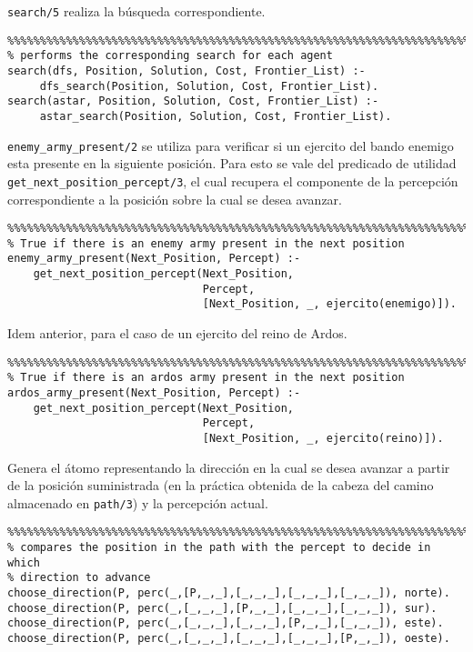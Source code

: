 \documentclass[a4paper,12pt]{report}
\begin{document}
\texttt{search/5} realiza la b\'{u}squeda correspondiente.

\begin{verbatim}
%%%%%%%%%%%%%%%%%%%%%%%%%%%%%%%%%%%%%%%%%%%%%%%%%%%%%%%%%%%%%%%%%%%%%%%%%%%%%%%
% performs the corresponding search for each agent
search(dfs, Position, Solution, Cost, Frontier_List) :-
     dfs_search(Position, Solution, Cost, Frontier_List).
search(astar, Position, Solution, Cost, Frontier_List) :-
     astar_search(Position, Solution, Cost, Frontier_List).

\end{verbatim}

\texttt{enemy\_army\_present/2} se utiliza para verificar si un ejercito del bando enemigo esta presente en la
siguiente posici\'{o}n. Para esto se vale del predicado de utilidad \texttt{get\_next\_position\_percept/3}, el cual
recupera el componente de la percepci\'{o}n correspondiente a la posici\'{o}n sobre la cual se desea avanzar.

\begin{verbatim}
%%%%%%%%%%%%%%%%%%%%%%%%%%%%%%%%%%%%%%%%%%%%%%%%%%%%%%%%%%%%%%%%%%%%%%%%%%%%%%%
% True if there is an enemy army present in the next position
enemy_army_present(Next_Position, Percept) :-
    get_next_position_percept(Next_Position,
                              Percept,
                              [Next_Position, _, ejercito(enemigo)]).

\end{verbatim}

Idem anterior, para el caso de un ejercito del reino de Ardos.

\begin{verbatim}
%%%%%%%%%%%%%%%%%%%%%%%%%%%%%%%%%%%%%%%%%%%%%%%%%%%%%%%%%%%%%%%%%%%%%%%%%%%%%%%
% True if there is an ardos army present in the next position
ardos_army_present(Next_Position, Percept) :-
    get_next_position_percept(Next_Position,
                              Percept,
                              [Next_Position, _, ejercito(reino)]).

\end{verbatim}

Genera el \'{a}tomo representando la direcci\'{o}n en la cual se desea avanzar a partir de la posici\'{o}n suministrada
(en la pr\'{a}ctica obtenida de la cabeza del camino almacenado en \texttt{path/3}) y la percepci\'{o}n actual.

\begin{verbatim}
%%%%%%%%%%%%%%%%%%%%%%%%%%%%%%%%%%%%%%%%%%%%%%%%%%%%%%%%%%%%%%%%%%%%%%%%%%%%%%%
% compares the position in the path with the percept to decide in which
% direction to advance
choose_direction(P, perc(_,[P,_,_],[_,_,_],[_,_,_],[_,_,_]), norte).
choose_direction(P, perc(_,[_,_,_],[P,_,_],[_,_,_],[_,_,_]), sur).
choose_direction(P, perc(_,[_,_,_],[_,_,_],[P,_,_],[_,_,_]), este).
choose_direction(P, perc(_,[_,_,_],[_,_,_],[_,_,_],[P,_,_]), oeste).

\end{verbatim}
\end{document}
